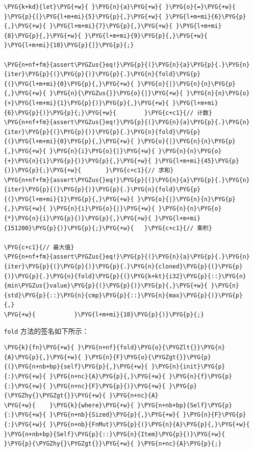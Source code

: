 \begin{Verbatim}[commandchars=\\\{\},breaklines=true,breakanywhere=true,fontsize=\codefont,xleftmargin=17bp]
\PYG{k+kd}{let}\PYG{+w}{ }\PYG{n}{a}\PYG{+w}{ }\PYG{o}{=}\PYG{+w}{ }\PYG{p}{[}\PYG{l+m+mi}{5}\PYG{p}{,}\PYG{+w}{ }\PYG{l+m+mi}{6}\PYG{p}{,}\PYG{+w}{ }\PYG{l+m+mi}{7}\PYG{p}{,}\PYG{+w}{ }\PYG{l+m+mi}{8}\PYG{p}{,}\PYG{+w}{ }\PYG{l+m+mi}{9}\PYG{p}{,}\PYG{+w}{ }\PYG{l+m+mi}{10}\PYG{p}{]}\PYG{p}{;}

\PYG{n+nf+fm}{assert\PYGZus{}eq!}\PYG{p}{(}\PYG{n}{a}\PYG{p}{.}\PYG{n}{iter}\PYG{p}{(}\PYG{p}{)}\PYG{p}{.}\PYG{n}{fold}\PYG{p}{(}\PYG{l+m+mi}{0}\PYG{p}{,}\PYG{+w}{ }\PYG{o}{|}\PYG{n}{n}\PYG{p}{,}\PYG{+w}{ }\PYG{n}{\PYGZus{}}\PYG{o}{|}\PYG{+w}{ }\PYG{n}{n}\PYG{o}{+}\PYG{l+m+mi}{1}\PYG{p}{)}\PYG{p}{,}\PYG{+w}{ }\PYG{l+m+mi}{6}\PYG{p}{)}\PYG{p}{;}\PYG{+w}{        }\PYG{c+c1}{// 计数}
\PYG{n+nf+fm}{assert\PYGZus{}eq!}\PYG{p}{(}\PYG{n}{a}\PYG{p}{.}\PYG{n}{iter}\PYG{p}{(}\PYG{p}{)}\PYG{p}{.}\PYG{n}{fold}\PYG{p}{(}\PYG{l+m+mi}{0}\PYG{p}{,}\PYG{+w}{ }\PYG{o}{|}\PYG{n}{n}\PYG{p}{,}\PYG{+w}{ }\PYG{n}{i}\PYG{o}{|}\PYG{+w}{ }\PYG{n}{n}\PYG{o}{+}\PYG{n}{i}\PYG{p}{)}\PYG{p}{,}\PYG{+w}{ }\PYG{l+m+mi}{45}\PYG{p}{)}\PYG{p}{;}\PYG{+w}{       }\PYG{c+c1}{// 求和}
\PYG{n+nf+fm}{assert\PYGZus{}eq!}\PYG{p}{(}\PYG{n}{a}\PYG{p}{.}\PYG{n}{iter}\PYG{p}{(}\PYG{p}{)}\PYG{p}{.}\PYG{n}{fold}\PYG{p}{(}\PYG{l+m+mi}{1}\PYG{p}{,}\PYG{+w}{ }\PYG{o}{|}\PYG{n}{n}\PYG{p}{,}\PYG{+w}{ }\PYG{n}{i}\PYG{o}{|}\PYG{+w}{ }\PYG{n}{n}\PYG{o}{*}\PYG{n}{i}\PYG{p}{)}\PYG{p}{,}\PYG{+w}{ }\PYG{l+m+mi}{151200}\PYG{p}{)}\PYG{p}{;}\PYG{+w}{   }\PYG{c+c1}{// 乘积}

\PYG{c+c1}{// 最大值}
\PYG{n+nf+fm}{assert\PYGZus{}eq!}\PYG{p}{(}\PYG{n}{a}\PYG{p}{.}\PYG{n}{iter}\PYG{p}{(}\PYG{p}{)}\PYG{p}{.}\PYG{n}{cloned}\PYG{p}{(}\PYG{p}{)}\PYG{p}{.}\PYG{n}{fold}\PYG{p}{(}\PYG{k+kt}{i32}\PYG{p}{::}\PYG{n}{min\PYGZus{}value}\PYG{p}{(}\PYG{p}{)}\PYG{p}{,}\PYG{+w}{ }\PYG{n}{std}\PYG{p}{::}\PYG{n}{cmp}\PYG{p}{::}\PYG{n}{max}\PYG{p}{)}\PYG{p}{,}
\PYG{+w}{           }\PYG{l+m+mi}{10}\PYG{p}{)}\PYG{p}{;}
\end{Verbatim}

\texttt{fold} 方法的签名如下所示：

\begin{Verbatim}[commandchars=\\\{\},breaklines=true,breakanywhere=true,fontsize=\codefont,xleftmargin=17bp]
\PYG{k}{fn}\PYG{+w}{ }\PYG{n+nf}{fold}\PYG{o}{\PYGZlt{}}\PYG{n}{A}\PYG{p}{,}\PYG{+w}{ }\PYG{n}{F}\PYG{o}{\PYGZgt{}}\PYG{p}{(}\PYG{n+nb+bp}{self}\PYG{p}{,}\PYG{+w}{ }\PYG{n}{init}\PYG{p}{:}\PYG{+w}{ }\PYG{n+nc}{A}\PYG{p}{,}\PYG{+w}{ }\PYG{n}{f}\PYG{p}{:}\PYG{+w}{ }\PYG{n+nc}{F}\PYG{p}{)}\PYG{+w}{ }\PYG{p}{\PYGZhy{}\PYGZgt{}}\PYG{+w}{ }\PYG{n+nc}{A}
\PYG{+w}{    }\PYG{k}{where}\PYG{+w}{ }\PYG{n+nb+bp}{Self}\PYG{p}{:}\PYG{+w}{ }\PYG{n+nb}{Sized}\PYG{p}{,}\PYG{+w}{ }\PYG{n}{F}\PYG{p}{:}\PYG{+w}{ }\PYG{n+nb}{FnMut}\PYG{p}{(}\PYG{n}{A}\PYG{p}{,}\PYG{+w}{ }\PYG{n+nb+bp}{Self}\PYG{p}{::}\PYG{n}{Item}\PYG{p}{)}\PYG{+w}{ }\PYG{p}{\PYGZhy{}\PYGZgt{}}\PYG{+w}{ }\PYG{n+nc}{A}\PYG{p}{;}
\end{Verbatim}

